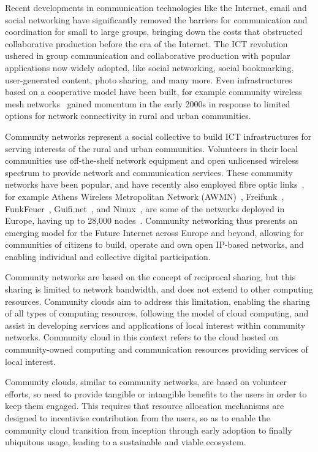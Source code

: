 

Recent developments in communication technologies like the Internet, email and social networking have significantly removed the barriers for communication and coordination for small to large groups, 
bringing down the costs that obstructed collaborative production before the era of the Internet.
The ICT revolution ushered in group communication and collaborative production with popular applications now widely adopted, like social networking, social bookmarking, user-generated content, photo sharing, and many more. 
Even infrastructures based on a cooperative model have been built, for example community wireless mesh networks~\cite{Braem2013} gained momentum in the early 2000s in response to limited options for network connectivity in rural and urban communities.

Community networks represent a social collective to build ICT infrastructures for serving interests of the rural and urban communities.
Volunteers in their local communities use off-the-shelf network equipment and open unlicensed wireless spectrum to provide network and communication services.
These community networks have been popular, and have recently also employed fibre optic links~\cite{Baig2015Guifi},
for example
	Athens Wireless Metropolitan Network (AWMN)~\cite{Awmn}, 
	Freifunk~\cite{Freifunk},
	FunkFeuer~\cite{Funkfeuer},
	Guifi.net~\cite{Guifinet}, and
	Ninux~\cite{Ninux},
are some of the networks deployed in Europe, having up to 28,000 nodes~\cite{Baig2015Guifi}.
Community networking thus presents an emerging model for the Future Internet across Europe and beyond,
allowing for communities of citizens to build, operate and own open IP-based networks, 
and enabling individual and collective digital participation. 


Community networks are based on the concept of reciprocal sharing, 
but this sharing is limited to network bandwidth, 
and does not extend to other computing resources.
Community clouds aim to address this limitation, enabling the sharing of all types of computing resources, 
following the model of cloud computing, and assist in developing services and applications of local interest within community networks. 
Community cloud in this context refers to the cloud hosted on community-owned computing and communication resources providing services of local interest. 


Community clouds, similar to community networks, are based on volunteer efforts, 
so need to provide tangible or intangible benefits to the users in order to keep them engaged.
This requires that resource allocation mechanisms are designed 
to incentivise contribution from the users,
so as to enable the community cloud transition from inception through early adoption to finally ubiquitous usage, 
leading to a sustainable and viable ecosystem.
